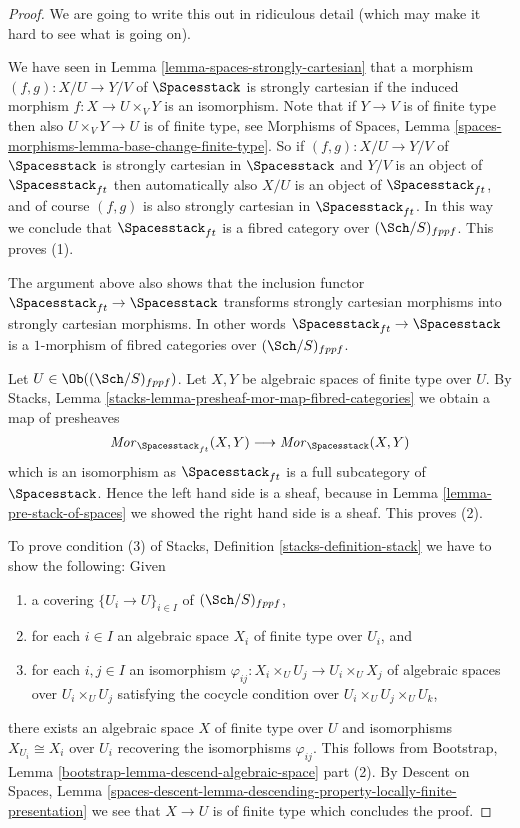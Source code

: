 \begin{proof}
We are going to write this out in ridiculous detail (which may make
it hard to see what is going on).

\medskip\noindent
We have seen in
Lemma \ref{lemma-spaces-strongly-cartesian}
that a morphism $(f, g) : X/U \to Y/V$ of $\Spacesstack$ is
strongly cartesian if the induced morphism $f : X \to U \times_V Y$
is an isomorphism. Note that if $Y \to V$ is of finite type
then also $U \times_V Y \to U$ is of finite type, see
Morphisms of Spaces,
Lemma \ref{spaces-morphisms-lemma-base-change-finite-type}.
So if $(f, g) : X/U \to Y/V$ of $\Spacesstack$ is
strongly cartesian in $\Spacesstack$ and $Y/V$ is an object
of $\Spacesstack_{ft}$ then automatically also $X/U$ is an
object of $\Spacesstack_{ft}$, and of course $(f, g)$ is
also strongly cartesian in $\Spacesstack_{ft}$. In this way
we conclude that $\Spacesstack_{ft}$ is a fibred category over
$(\Sch/S)_{fppf}$. This proves (1).

\medskip\noindent
The argument above also shows that the inclusion
functor $\Spacesstack_{ft} \to \Spacesstack$ transforms
strongly cartesian morphisms into strongly cartesian morphisms.
In other words $\Spacesstack_{ft} \to \Spacesstack$ is
a $1$-morphism of fibred categories over $(\Sch/S)_{fppf}$.

\medskip\noindent
Let $U \in \Ob((\Sch/S)_{fppf})$.
Let $X, Y$ be algebraic spaces of finite type over $U$. By
Stacks, Lemma \ref{stacks-lemma-presheaf-mor-map-fibred-categories}
we obtain a map of presheaves
$$
\mathit{Mor}_{\Spacesstack_{ft}}(X, Y)
\longrightarrow
\mathit{Mor}_{\Spacesstack}(X, Y)
$$
which is an isomorphism as $\Spacesstack_{ft}$ is a full subcategory of
$\Spacesstack$. Hence the left hand side is a sheaf, because in
Lemma \ref{lemma-pre-stack-of-spaces}
we showed the right hand side is a sheaf. This proves (2).

\medskip\noindent
To prove condition (3) of
Stacks, Definition \ref{stacks-definition-stack}
we have to show the following: Given
\begin{enumerate}
\item a covering $\{U_i \to U\}_{i \in I}$ of $(\Sch/S)_{fppf}$,
\item for each $i \in I$ an algebraic space $X_i$ of finite type over $U_i$,
and
\item for each $i, j \in I$ an isomorphism
$\varphi_{ij} : X_i \times_U U_j \to U_i \times_U X_j$ of algebraic spaces
over $U_i \times_U U_j$ satisfying the cocycle condition over
$U_i \times_U U_j \times_U U_k$,
\end{enumerate}
there exists an algebraic space $X$ of finite type over $U$ and isomorphisms
$X_{U_i} \cong X_i$ over $U_i$ recovering the isomorphisms $\varphi_{ij}$.
This follows from
Bootstrap, Lemma \ref{bootstrap-lemma-descend-algebraic-space} part (2). By
Descent on Spaces, Lemma
\ref{spaces-descent-lemma-descending-property-locally-finite-presentation}
we see that $X \to U$ is of finite type which concludes the proof.
\end{proof}

